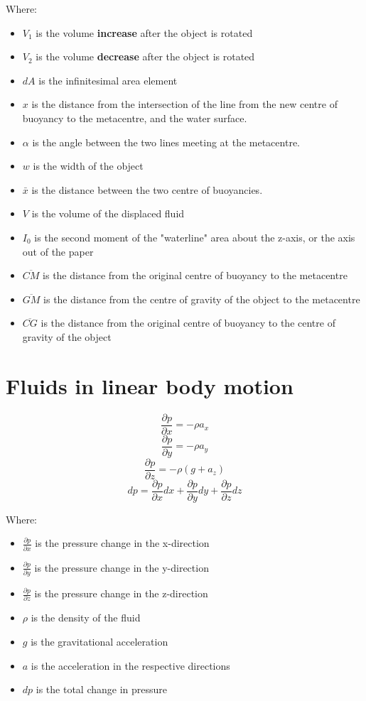 \documentclass[11pt]{article}
\begin{document}
\[\]

Where:
\begin{itemize}
\item \(V_1\) is the volume \textbf{increase} after the object is rotated
\item \(V_2\) is the volume \textbf{decrease} after the object is rotated
\item \(dA\) is the infinitesimal area element
\item \(x\) is the distance from the intersection of the line from the new centre of buoyancy to the metacentre, and the water surface.
\item \(\alpha\) is the angle between the two lines meeting at the metacentre.
\item \(w\) is the width of the object
\item \(\bar{x}\) is the distance between the two centre of buoyancies.
\item \(V\) is the volume of the displaced fluid
\item \(I_0\) is the second moment of the "waterline" area about the z-axis, or the axis out of the paper
\item \(\overline{CM}\) is the distance from the original centre of buoyancy to the metacentre
\item \(\overline{GM}\) is the distance from the centre of gravity of the object to the metacentre
\item \(\overline{CG}\) is the distance from the original centre of buoyancy to the centre of gravity of the object
\end{itemize}


\section{Fluids in linear body motion}
\label{sec:org51b02ad}
\[\frac{\partial p}{\partial x} = - \rho a_x\]
\[\frac{\partial p}{\partial y} = - \rho a_y\]
\[\frac{\partial p}{\partial z} = - \rho (g + a_z)\]
\[dp = \frac{\partial p}{\partial x} dx + \frac{\partial p}{\partial y} dy + \frac{\partial p}{\partial z} dz\]

Where:
\begin{itemize}
\item \(\frac{\partial p}{\partial x}\) is the pressure change in the x-direction
\item \(\frac{\partial p}{\partial y}\) is the pressure change in the y-direction
\item \(\frac{\partial p}{\partial z}\) is the pressure change in the z-direction
\item \(\rho\) is the density of the fluid
\item \(g\) is the gravitational acceleration
\item \(a\) is the acceleration in the respective directions
\item \(dp\) is the total change in pressure
\end{itemize}
\end{document}

